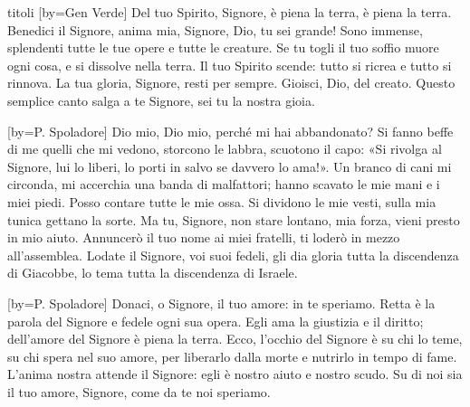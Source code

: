\begin{songs}{titoli}
[by={Gen Verde}]
\beginchorus
Del tuo Spirito, Signore,
è piena la terra, è piena la terra. 
\endchorus
\beginverse
Benedici il Signore, anima mia, Signore, Dio, tu sei grande!
Sono immense, splendenti tutte le tue opere e tutte le creature.
\endverse
\beginverse
Se tu togli il tuo soffio muore ogni cosa, e si dissolve nella terra.
Il tuo Spirito scende: tutto si ricrea e tutto si rinnova.
\endverse
\beginverse
La tua gloria, Signore, resti per sempre. Gioisci, Dio, del creato.
Questo semplice canto salga a te Signore, sei tu la nostra gioia.
\endverse
\endsong

[by={P. Spoladore}]
\beginchorus
Dio mio, Dio mio, perché mi hai abbandonato? 
\endchorus
\beginverse
Si fanno beffe di me quelli che mi vedono,
storcono le labbra, scuotono il capo:
«Si rivolga al Signore, lui lo liberi,
lo porti in salvo se davvero lo ama!».
\endverse
\beginverse
Un branco di cani mi circonda,
mi accerchia una banda di malfattori;
hanno scavato le mie mani e i miei piedi.
Posso contare tutte le mie ossa.
\endverse
\beginverse
Si dividono le mie vesti,
sulla mia tunica gettano la sorte.
Ma tu, Signore, non stare lontano,
mia forza, vieni presto in mio aiuto.
\endverse
\beginverse
Annuncerò il tuo nome ai miei fratelli,
ti loderò in mezzo all'assemblea.
Lodate il Signore, voi suoi fedeli,
gli dia gloria tutta la discendenza di Giacobbe,
lo tema tutta la discendenza di Israele.
\endverse
\endsong

[by={P. Spoladore}]
\beginchorus
Donaci, o Signore, il tuo amore: in te speriamo. 
\endchorus
\beginverse
Retta è la parola del Signore e fedele ogni sua opera.
Egli ama la giustizia e il diritto; dell'amore del Signore è piena la terra.
\endverse
\beginverse
Ecco, l'occhio del Signore è su chi lo teme, su chi spera nel suo amore,
per liberarlo dalla morte e nutrirlo in tempo di fame.
\endverse
\beginverse
L'anima nostra attende il Signore: egli è nostro aiuto e nostro scudo.
Su di noi sia il tuo amore, Signore, come da te noi speriamo.
\endverse
\endsong


\end{songs}
